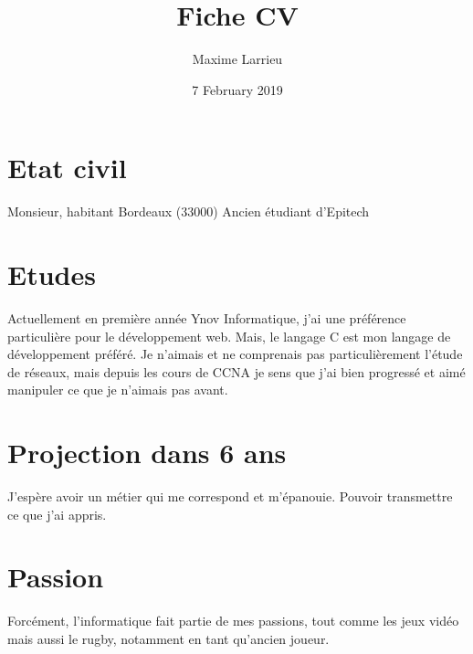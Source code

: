 \documentclass[12pt]{article}
\title{Fiche CV}
\author{Maxime Larrieu}
\date{7 February 2019}
\begin{document}
\maketitle

\section{Etat civil}
Monsieur, habitant Bordeaux (33000)
Ancien étudiant d'Epitech

\section{Etudes}
Actuellement en première année Ynov Informatique, j'ai une préférence particulière pour le développement web. Mais, le langage C est mon langage de développement préféré. Je n'aimais et ne comprenais pas particulièrement l'étude de réseaux, mais depuis les cours de CCNA je sens que j'ai bien progressé et aimé manipuler ce que je n'aimais pas avant.

\section{Projection dans 6 ans}
J'espère avoir un métier qui me correspond et m'épanouie. Pouvoir transmettre ce que j'ai appris.

\section{Passion}
Forcément, l'informatique fait partie de mes passions, tout comme les jeux vidéo mais aussi le rugby, notamment en tant qu'ancien joueur.
\end{document}
